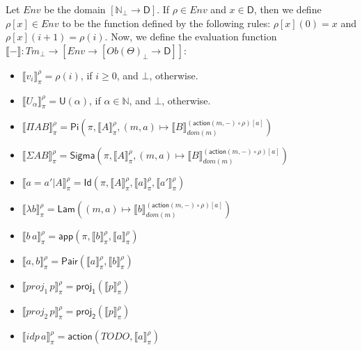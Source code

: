 \documentclass{amsart}
\theoremstyle{definition}
\theoremstyle{remark}
\newcommand{\D}{\mathsf{D}}
\newcommand{\nats}{\mathbb{N}}
\numberwithin{table}{section}
\begin{document}
Let $Env$ be the domain $[\nats_\bot \to \D]$.
If $\rho \in Env$ and $x \in \D$, then we define $\rho[x] \in Env$ to be the function defined by the following rules: $\rho[x](0) = x$ and $\rho[x](i+1) = \rho(i)$.
Now, we define the evaluation function $\llbracket - \rrbracket : Tm_\bot \to [Env \to [Ob(\Theta)_\bot \to \D]]$:
\begin{itemize}
\item[] $\llbracket v_i \rrbracket^\rho_\pi = \rho(i)$, if $i \geq 0$, and $\bot$, otherwise.
\item[] $\llbracket U_\alpha \rrbracket^\rho_\pi = \mathsf{U}(\alpha)$, if $\alpha \in \nats$, and $\bot$, otherwise.
\item[] $\llbracket \Pi A B \rrbracket^\rho_\pi = \mathsf{Pi}(\pi, \llbracket A \rrbracket^\rho_\pi, (m, a) \mapsto \llbracket B \rrbracket^{(\mathsf{action}(m,-) \circ \rho)[a]}_{dom(m)})$
\item[] $\llbracket \Sigma A B \rrbracket^\rho_\pi = \mathsf{Sigma}(\pi, \llbracket A \rrbracket^\rho_\pi, (m, a) \mapsto \llbracket B \rrbracket^{(\mathsf{action}(m,-) \circ \rho)[a]}_{dom(m)})$
\item[] $\llbracket a = a' | A \rrbracket^\rho_\pi = \mathsf{Id}(\pi, \llbracket A \rrbracket^\rho_\pi, \llbracket a \rrbracket^\rho_\pi, \llbracket a' \rrbracket^\rho_\pi)$
\item[] $\llbracket \lambda b \rrbracket^\rho_\pi = \mathsf{Lam}((m, a) \mapsto \llbracket b \rrbracket^{(\mathsf{action}(m,-) \circ \rho)[a]}_{dom(m)})$
\item[] $\llbracket b\,a \rrbracket^\rho_\pi = \mathsf{app}(\pi, \llbracket b \rrbracket^\rho_\pi, \llbracket a \rrbracket^\rho_\pi)$
\item[] $\llbracket a, b \rrbracket^\rho_\pi = \mathsf{Pair}(\llbracket a \rrbracket^\rho_\pi, \llbracket b \rrbracket^\rho_\pi)$
\item[] $\llbracket proj_1\,p \rrbracket^\rho_\pi = \mathsf{proj_1}(\llbracket p \rrbracket^\rho_\pi)$
\item[] $\llbracket proj_2\,p \rrbracket^\rho_\pi = \mathsf{proj_2}(\llbracket p \rrbracket^\rho_\pi)$
\item[] $\llbracket idp\,a \rrbracket^\rho_\pi = \mathsf{action}(TODO,\llbracket a \rrbracket^\rho_\pi)$
\end{itemize}
\end{document}
